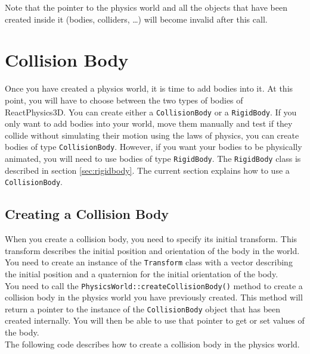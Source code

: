 \documentclass[a4paper,12pt]{article}
\begin{document}
    \vspace{0.6cm}

    Note that the pointer to the physics world and all the objects that have been created inside it (bodies, colliders, \dots) will become invalid after
    this call.

    \section{Collision Body}
    \label{sec:collisionbody}

    Once you have created a physics world, it is time to add bodies into it. At this point, you will have to choose between the two types of bodies of
    ReactPhysics3D. You can create either a \texttt{CollisionBody} or a \texttt{RigidBody}. If you only want to add bodies into your world, move them
    manually and test if they collide without simulating their motion using the laws of physics, you can create bodies of type \texttt{CollisionBody}.
    However, if you want your bodies to be physically animated, you will need to use bodies of type \texttt{RigidBody}. The \texttt{RigidBody} class is
    described in section \ref{sec:rigidbody}. The current section explains how to use a \texttt{CollisionBody}. 

    \subsection{Creating a Collision Body}

    When you create a collision body, you need to specify its initial transform. This transform describes the initial
    position and orientation of the body in the world. You need to create an instance of the \texttt{Transform} class with a vector describing the
    initial position and a quaternion for the initial orientation of the body. \\

    You need to call the \texttt{PhysicsWorld::createCollisionBody()} method to create a collision body in the physics world you have previously created.
    This method will return a pointer to the instance of the \texttt{CollisionBody} object that has been created internally. You will then be able to
    use that pointer to get or set values of the body. \\

    The following code describes how to create a collision body in the physics world. \\
\end{document}
